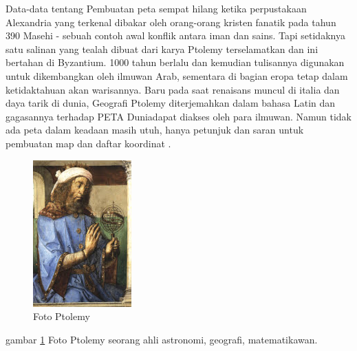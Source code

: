 	Data-data tentang Pembuatan peta sempat hilang ketika perpustakaan Alexandria yang terkenal dibakar oleh orang-orang kristen fanatik pada tahun 390 Masehi - sebuah contoh awal konflik antara iman dan sains. Tapi setidaknya satu salinan yang tealah dibuat dari karya Ptolemy terselamatkan dan ini bertahan di Byzantium. 1000 tahun berlalu dan kemudian tulisannya digunakan untuk dikembangkan oleh ilmuwan Arab, sementara di bagian eropa tetap dalam ketidaktahuan akan warisannya. Baru pada saat renaisans muncul di italia dan daya tarik di dunia, Geografi Ptolemy diterjemahkan dalam bahasa Latin dan gagasannya terhadap PETA Duniadapat diakses oleh para ilmuwan.
	Namun tidak ada peta dalam keadaan masih utuh, hanya petunjuk dan saran untuk pembuatan map dan daftar koordinat \cite{smart2005maps}.
	\begin{figure} [ht]
	\centerline{\includegraphics[width=.5\textwidth]{figures/ptolemy}}
	\caption{Foto Ptolemy}
	\label{ptolemy}
	\end{figure}
	gambar \ref{ptolemy} Foto Ptolemy seorang ahli astronomi, geografi, matematikawan.

